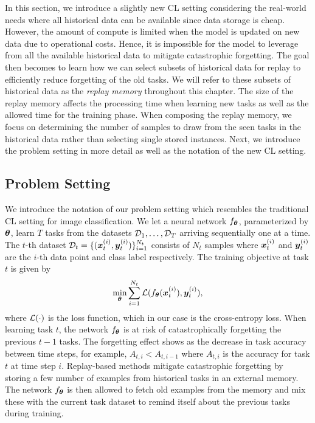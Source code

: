 In this section, we introduce a slightly new CL setting considering the real-world needs where all historical data can be available since data storage is cheap. However, the amount of compute is limited when the model is updated on new data due to operational costs. Hence, it is impossible for the model to leverage from all the available historical data to mitigate catastrophic forgetting. The goal then becomes to learn how we can select subsets of historical data for replay to efficiently reduce forgetting of the old tasks. We will refer to these subsets of historical data as the \textit{replay memory} throughout this chapter. The size of the replay memory affects the processing time when learning new tasks as well as the allowed time for the training phase. When composing the replay memory, we focus on determining the number of samples to draw from the seen tasks in the historical data rather than selecting single stored instances. Next, we introduce the problem setting in more detail as well as the notation of the new CL setting. 


\subsection{Problem Setting}

We introduce the notation of our problem setting which resembles the traditional CL setting for image classification. We let a neural network $f_{{\bm{\theta}}}$, parameterized by ${\bm{\theta}}$, learn $T$ tasks from the datasets ${\mathcal{D}}_1, \dots, {\mathcal{D}}_T$ arriving sequentially one at a time. The $t$-th dataset ${\mathcal{D}}_t = \{({\bm{x}}_{t}^{(i)}, {\bm{y}}_{t}^{(i)})\}_{i=1}^{N_{t}}$ consists of $N_t$ samples where ${\bm{x}}_{t}^{(i)}$ and ${\bm{y}}_{t}^{(i)}$ are the $i$-th data point and class label respectively. The training objective at task $t$ is given by 
\vspace{-2mm}
\begin{align}
	\underset{{\bm{\theta}}}{\text{min}} \sum_{i=1}^{N_t} {\mathcal{L}}(f_{{\bm{\theta}}}({\bm{x}}_t^{(i)}), {\bm{y}}_{t}^{(i)}),
\end{align}
where ${\mathcal{L}}(\cdot)$ is the loss function, which in our case is the cross-entropy loss.  
When learning task $t$, the network $f_{{\bm{\theta}}}$ is at risk of catastrophically forgetting the previous $t-1$ tasks. The forgetting effect shows as the decrease in task accuracy between time steps, for example, $A_{t, i} < A_{t, i-1}$ where $A_{t, i}$ is the accuracy for task $t$ at time step $i$. Replay-based methods mitigate catastrophic forgetting by storing a few number of examples from historical tasks in an external memory. The network $f_{{\bm{\theta}}}$ is then allowed to fetch old examples from the memory and mix these with the current task dataset to remind itself about the previous tasks during training. 

